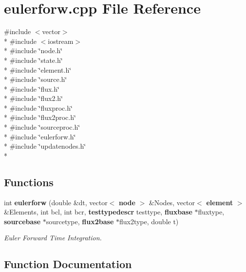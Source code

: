 \section{eulerforw.\-cpp File Reference}
\label{eulerforw_8cpp}
{\ttfamily \#include $<$vector$>$}\\*
{\ttfamily \#include $<$iostream$>$}\\*
{\ttfamily \#include \char`\"{}node.\-h\char`\"{}}\\*
{\ttfamily \#include \char`\"{}state.\-h\char`\"{}}\\*
{\ttfamily \#include \char`\"{}element.\-h\char`\"{}}\\*
{\ttfamily \#include \char`\"{}source.\-h\char`\"{}}\\*
{\ttfamily \#include \char`\"{}flux.\-h\char`\"{}}\\*
{\ttfamily \#include \char`\"{}flux2.\-h\char`\"{}}\\*
{\ttfamily \#include \char`\"{}fluxproc.\-h\char`\"{}}\\*
{\ttfamily \#include \char`\"{}flux2proc.\-h\char`\"{}}\\*
{\ttfamily \#include \char`\"{}sourceproc.\-h\char`\"{}}\\*
{\ttfamily \#include \char`\"{}eulerforw.\-h\char`\"{}}\\*
{\ttfamily \#include \char`\"{}updatenodes.\-h\char`\"{}}\\*
\subsection*{Functions}
\begin{DoxyCompactItemize}
\item 
int {\bf eulerforw} (double \&dt, vector$<$ {\bf node} $>$ \&Nodes, vector$<$ {\bf element} $>$ \&Elements, int bcl, int bcr, {\bf testtypedescr} testtype, {\bf fluxbase} $\ast$fluxtype, {\bf sourcebase} $\ast$sourcetype, {\bf flux2base} $\ast$flux2type, double t)
\begin{DoxyCompactList}\small\item\em Euler Forward Time Integration. \end{DoxyCompactList}\end{DoxyCompactItemize}


\subsection{Function Documentation}
